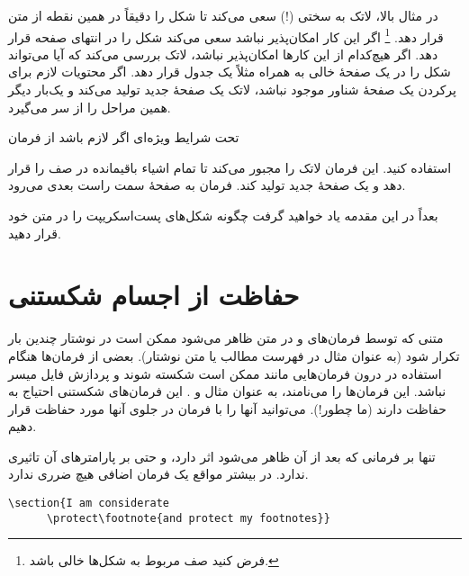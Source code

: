 \noindent 
در مثال بالا، لاتک به سختی (!) سعی می‌کند تا شکل را دقیقاً در همین نقطه از متن قرار دهد.%
\footnote{فرض کنید صف مربوط به شکل‌ها خالی باشد.}
اگر این کار امکان‌پذیر نباشد سعی می‌کند شکل را در انتهای صفحه قرار دهد. اگر هیچ‌کدام از این کارها امکان‌پذیر نباشد، لاتک بررسی می‌کند که آیا می‌تواند شکل را در یک صفحهٔ خالی به همراه مثلاً یک جدول قرار دهد. اگر محتویات لازم برای پرکردن یک صفحهٔ شناور موجود نباشد، لاتک یک صفحهٔ جدید تولید می‌کند و یک‌بار دیگر همین مراحل را از سر می‌گیرد.

تحت شرایط ویژه‌ای اگر لازم باشد از فرمان 

\begin{lscommand}
   
\end{lscommand}

\noindent 
استفاده کنید. این فرمان لاتک را مجبور می‌کند تا تمام اشیاء باقیمانده در صف را قرار دهد و یک صفحهٔ جدید تولید کند. فرمان
به صفحهٔ سمت راست بعدی می‌رود.

بعداً در این مقدمه یاد خواهید گرفت چگونه شکل‌های پست‌اسکریپت را در متن خود قرار دهید.
\section{حفاظت از اجسام شکستنی}
متنی که توسط فرمان‌های 
 و 
در متن ظاهر می‌شود ممکن است در نوشتار چندین بار تکرار شود (به عنوان مثال در فهرست مطالب یا متن نوشتار). بعضی از فرمان‌ها هنگام استفاده در درون فرمان‌هایی مانند 
ممکن است شکسته شوند و پردازش فایل میسر نباشد. این فرمان‌ها را 
می‌نامند، به عنوان مثال 
 و .
این فرمان‌های شکستنی احتیاج به حفاظت دارند (ما چطور!). می‌توانید آنها را با فرمان 
در جلوی آنها مورد حفاظت قرار دهیم.

تنها بر فرمانی که بعد از آن ظاهر می‌شود اثر دارد، و حتی بر پارامترهای آن تاثیری ندارد. در بیشتر مواقع یک فرمان اضافی 
هیچ ضرری ندارد.

\begin{code}
\verb|\section{I am considerate|\\
\verb|      \protect\footnote{and protect my footnotes}}|
\end{code}

